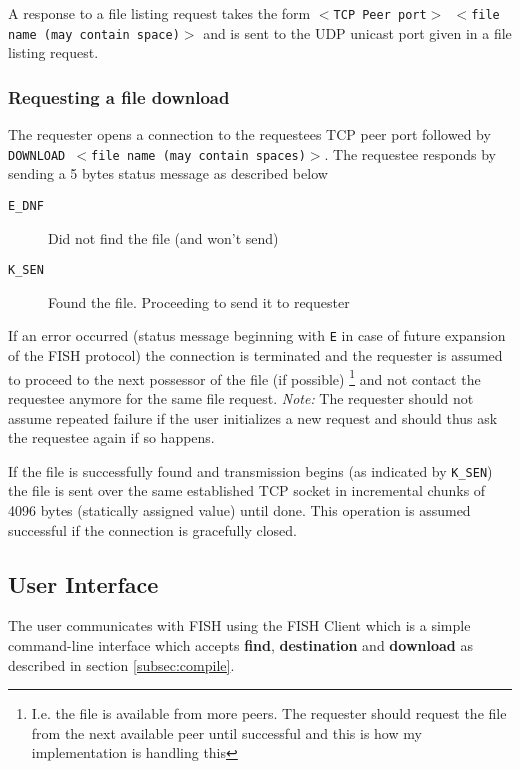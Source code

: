 \documentclass[11pt]{article}
\begin{document}
A response to a file listing request takes the form
\texttt{$<$TCP Peer port$>$ $<$file name (may contain space)$>$} and is
sent to the UDP unicast port given in a file listing request.

\subsubsection{Requesting a file download}

The requester opens a connection to the requestees TCP peer port followed by
\texttt{DOWNLOAD $<$file name (may contain spaces)$>$}. The requestee responds
by sending a 5 bytes status message as described below

\begin{description}
    \item[\texttt{E\_DNF}] Did not find the file (and won't send)
    \item[\texttt{K\_SEN}] Found the file. Proceeding to send it to requester
\end{description}

If an error occurred (status message beginning with \texttt{E} in case of
future expansion of the FISH protocol) the connection is terminated and the
requester is assumed to proceed to the next possessor of the file (if possible)
\footnote{I.e. the file is available from more peers. The requester should
request the file from the next available peer until successful and this is how
my implementation is handling this}
and not contact the requestee anymore for the same file request. \textit{Note:}
The requester should not assume repeated failure if the user initializes a new
request and should thus ask the requestee again if so happens.

If the file is successfully found and transmission begins (as indicated by
\texttt{K\_SEN}) the file is sent over the same established TCP socket in
incremental chunks of 4096 bytes (statically assigned value) until done.
This operation is assumed successful if the connection is gracefully closed.

\subsection{User Interface}
\label{subsec:ui}

The user communicates with FISH using the FISH Client which is a simple
command-line interface which accepts
\textbf{find}, \textbf{destination} and \textbf{download} as described in
section \ref{subsec:compile}.
\end{document}
